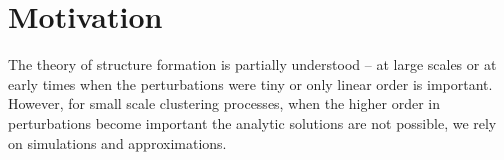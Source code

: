 \section{Motivation}

The theory of structure formation is partially understood --  at large scales 
or at early times when the perturbations were tiny or only linear order is important. 
However, for small scale clustering processes, when the higher order in perturbations 
become important the analytic solutions are not possible, we rely on simulations and 
approximations. 

